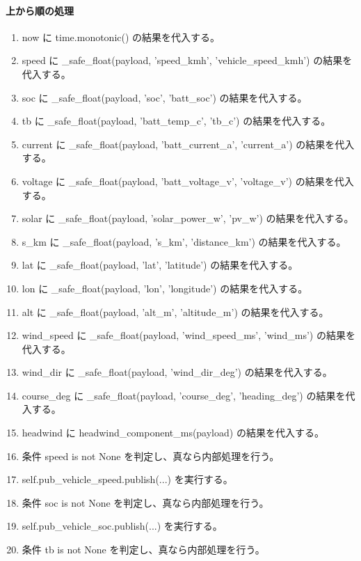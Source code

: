 \documentclass[a4paper,11pt]{article}
\begin{document}
            \paragraph{上から順の処理}
            \begin{enumerate}[leftmargin=1.8em]
            \item now に time.monotonic() の結果を代入する。
\item speed に \_safe\_float(payload, 'speed\_kmh', 'vehicle\_speed\_kmh') の結果を代入する。
\item soc に \_safe\_float(payload, 'soc', 'batt\_soc') の結果を代入する。
\item tb に \_safe\_float(payload, 'batt\_temp\_c', 'tb\_c') の結果を代入する。
\item current に \_safe\_float(payload, 'batt\_current\_a', 'current\_a') の結果を代入する。
\item voltage に \_safe\_float(payload, 'batt\_voltage\_v', 'voltage\_v') の結果を代入する。
\item solar に \_safe\_float(payload, 'solar\_power\_w', 'pv\_w') の結果を代入する。
\item s\_km に \_safe\_float(payload, 's\_km', 'distance\_km') の結果を代入する。
\item lat に \_safe\_float(payload, 'lat', 'latitude') の結果を代入する。
\item lon に \_safe\_float(payload, 'lon', 'longitude') の結果を代入する。
\item alt に \_safe\_float(payload, 'alt\_m', 'altitude\_m') の結果を代入する。
\item wind\_speed に \_safe\_float(payload, 'wind\_speed\_ms', 'wind\_ms') の結果を代入する。
\item wind\_dir に \_safe\_float(payload, 'wind\_dir\_deg') の結果を代入する。
\item course\_deg に \_safe\_float(payload, 'course\_deg', 'heading\_deg') の結果を代入する。
\item headwind に headwind\_component\_ms(payload) の結果を代入する。
\item 条件 speed is not None を判定し、真なら内部処理を行う。
\item   self.pub\_vehicle\_speed.publish(...) を実行する。
\item 条件 soc is not None を判定し、真なら内部処理を行う。
\item   self.pub\_vehicle\_soc.publish(...) を実行する。
\item 条件 tb is not None を判定し、真なら内部処理を行う。

\end{enumerate}
\end{document}
